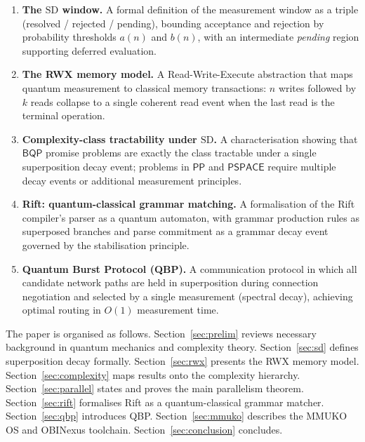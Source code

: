 \documentclass[11pt]{article}
\theoremstyle{plain}
\theoremstyle{definition}
\theoremstyle{remark}
\newcommand{\pspace}{\ensuremath{\mathsf{PSPACE}}}
\newcommand{\bqp}{\ensuremath{\mathsf{BQP}}}
\newcommand{\pp}{\ensuremath{\mathsf{PP}}}
\newcommand{\SD}{\ensuremath{\mathrm{SD}}}   %
\begin{document}
\begin{enumerate}[label=\textbf{C\arabic*.}]
  \item \textbf{The \SD{} window.}  A formal definition of the measurement
        window as a triple (resolved / rejected / pending), bounding
        acceptance and rejection by probability thresholds $a(n)$ and $b(n)$,
        with an intermediate \emph{pending} region supporting deferred
        evaluation.

  \item \textbf{The RWX memory model.}  A Read-Write-Execute abstraction that
        maps quantum measurement to classical memory transactions: $n$ writes
        followed by $k$ reads collapse to a single coherent read event when
        the last read is the terminal operation.

  \item \textbf{Complexity-class tractability under \SD.}  A characterisation
        showing that $\bqp$ promise problems are exactly the class tractable
        under a single superposition decay event; problems in $\pp$ and
        $\pspace$ require multiple decay events or additional measurement
        principles.

  \item \textbf{Rift: quantum-classical grammar matching.}  A formalisation
        of the Rift compiler's parser as a quantum automaton, with grammar
        production rules as superposed branches and parse commitment as a
        grammar decay event governed by the stabilisation principle.

  \item \textbf{Quantum Burst Protocol (QBP).}  A communication protocol in
        which all candidate network paths are held in superposition during
        connection negotiation and selected by a single measurement (spectral
        decay), achieving optimal routing in $O(1)$ measurement time.
\end{enumerate}

The paper is organised as follows.  Section~\ref{sec:prelim} reviews necessary
background in quantum mechanics and complexity theory.  Section~\ref{sec:sd}
defines superposition decay formally.  Section~\ref{sec:rwx} presents the
RWX memory model.  Section~\ref{sec:complexity} maps results onto the
complexity hierarchy.  Section~\ref{sec:parallel} states and proves the main
parallelism theorem.  Section~\ref{sec:rift} formalises Rift as a
quantum-classical grammar matcher.  Section~\ref{sec:qbp} introduces QBP.
Section~\ref{sec:mmuko} describes the MMUKO OS and OBINexus toolchain.
Section~\ref{sec:conclusion} concludes.
\end{document}
